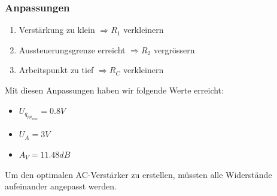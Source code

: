 \begin{frame}
	\frametitle{Anpassungen}
	\begin{enumerate}
		\item Verstärkung zu klein $\Rightarrow R_1$ verkleinern 
		\item Aussteuerungsgrenze erreicht $\Rightarrow R_2$ vergrössern
		\item Arbeitspunkt zu tief $\Rightarrow R_C$ verkleinern
	\end{enumerate}
	Mit diesen Anpassungen haben wir folgende Werte erreicht:
	\begin{itemize}
		\item $U_{q_{pp_{max}}} = 0.8V$
		\item $U_A = 3V$
		\item $A_V = 11.48dB$
	\end{itemize}
	Um den optimalen AC-Verstärker zu erstellen, müssten alle Widerstände
	aufeinander angepasst werden.
\end{frame}
